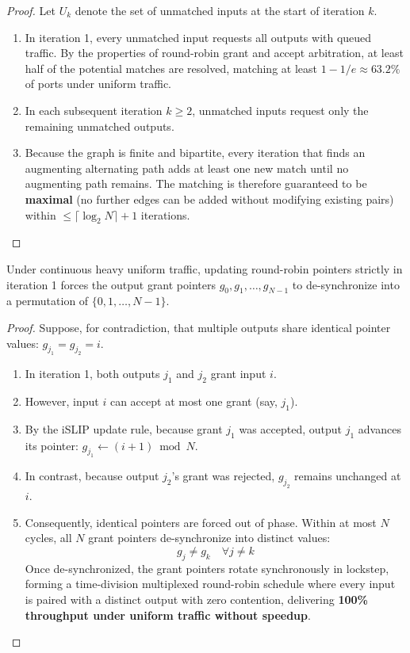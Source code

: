 \begin{proof}
Let $U_k$ denote the set of unmatched inputs at the start of iteration $k$.
\begin{enumerate}
    \item In iteration 1, every unmatched input requests all outputs with queued traffic. By the properties of round-robin grant and accept arbitration, at least half of the potential matches are resolved, matching at least $1 - 1/e \approx 63.2\%$ of ports under uniform traffic.
    \item In each subsequent iteration $k \ge 2$, unmatched inputs request only the remaining unmatched outputs.
    \item Because the graph is finite and bipartite, every iteration that finds an augmenting alternating path adds at least one new match until no augmenting path remains. The matching is therefore guaranteed to be \textbf{maximal} (no further edges can be added without modifying existing pairs) within $\le \lceil \log_2 N \rceil + 1$ iterations.
\end{enumerate}
\end{proof}

\begin{lemma}
Under continuous heavy uniform traffic, updating round-robin pointers strictly in iteration 1 forces the output grant pointers $g_0, g_1, \dots, g_{N-1}$ to de-synchronize into a permutation of $\{0, 1, \dots, N-1\}$.
\end{lemma}

\begin{proof}
Suppose, for contradiction, that multiple outputs share identical pointer values: $g_{j_1} = g_{j_2} = i$.
\begin{enumerate}
    \item In iteration 1, both outputs $j_1$ and $j_2$ grant input $i$.
    \item However, input $i$ can accept at most one grant (say, $j_1$).
    \item By the iSLIP update rule, because grant $j_1$ was accepted, output $j_1$ advances its pointer: $g_{j_1} \leftarrow (i + 1) \bmod N$.
    \item In contrast, because output $j_2$'s grant was rejected, $g_{j_2}$ remains unchanged at $i$.
    \item Consequently, identical pointers are forced out of phase. Within at most $N$ cycles, all $N$ grant pointers de-synchronize into distinct values:
    \begin{equation}
    g_j \ne g_k \quad \forall j \ne k
    \end{equation}
    Once de-synchronized, the grant pointers rotate synchronously in lockstep, forming a time-division multiplexed round-robin schedule where every input is paired with a distinct output with zero contention, delivering \textbf{100\% throughput under uniform traffic without speedup}.
\end{enumerate}
\end{proof}

